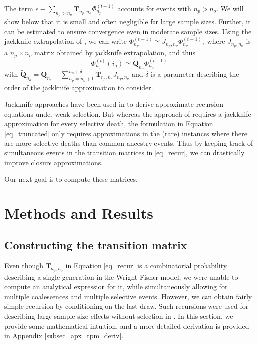 \documentclass[review,nonatbib]{elsarticle}
\newcommand{\afs}[2]{\Phi_{#1}^{(#2)}}
\newcommand{\sgcomment}[1]{{\color{red}{SG: #1}}}
\begin{document}
The term $\epsilon \equiv \sum_{n_p> n_o }  \mathbf{T}_{n_p,n_o} \afs{n_p}{t-1} $ 
accounts for events with $n_p>n_o.$ We will show below that it is small and often 
negligible for large sample sizes. 
Further, it can be estimated to ensure convergence even in moderate sample sizes.  
Using the jackknife extrapolation of \citep{Gravel2016}, we can write  
$\afs{n_p}{t-1} \simeq J_{n_p,n_o} \afs{n_o}{t-1},$ where $J_{n_p,n_o}$ is a $n_p\times n_o$
matrix obtained by jackknife extrapolation, and thus
\begin{equation}
  \afs{n_o}{t}(i_o) \simeq \tilde{\mathbf{Q}}_{n_o}        \afs{n_o}{t-1}                                       
\label{eq_truncated_jack}
\end{equation}
with  $ \tilde{\mathbf{Q}}_{n_o} =  \mathbf{Q}_{n_o}  +   \sum_{n_p=n_o+1 }^{n_o+\delta}  \mathbf{T}_{n_p,n_o} J_{n_p,n_o}$
and $\delta$ is a parameter describing the order of the jackknife approximation to consider. 
\sgcomment{There is something weird with the convention on index order here. Seems like the indices should be swapped for T
throughout} 

Jackknife approaches have been used in \cite{JouganousEtAl2017} to derive approximate 
recursion equations under weak selection. But whereas the approach of \cite{JouganousEtAl2017} 
requires a jackknife approximation for every selective death, the formulation in Equation \eqref{eq_truncated}
only requires approximations in the (rare) instances where there are more selective deaths than 
common ancestry events. Thus by keeping track of simultaneous events in the transition matrices
in \eqref{eq_recur}, we can drastically improve closure  approximations. 

Our next goal is to compute these matrices.

\section{Methods and Results}
\label{sec_methods}

\subsection{Constructing the transition matrix}
\label{subsec_trans_mat}

Even though $\mathbf{T}_{n_p,n_o}$ in Equation \ref{eq_recur} is a combinatorial probability
describing a single generation in the Wright-Fisher model, we were unable to compute an analytical
expression for it, while simultaneously allowing for multiple coalescences and multiple selective events.
However,
we can obtain fairly simple recursion by conditioning on the last draw. Such recursions were used for
describing large sample size effects without selection in \citep{BhaskarEtAl2014}. In this section,
we provide some mathematical intuition, and a more detailed derivation is provided in
Appendix \ref{subsec_apx_tpm_deriv}.
\end{document}
